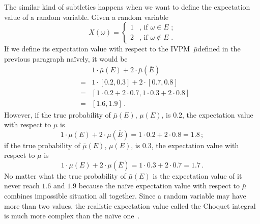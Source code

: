 \documentclass[english,reprint, aps, prl,superscriptaddress, showpacs,
showkeys, longbibliography, amsmath, amssymb]{revtex4-1}
\theoremstyle{plain}
\theoremstyle{definition}
\begin{document}
The similar kind of subtleties happens when we want to define the
expectation value of a random variable. Given a random variable
\begin{equation}
X\left(\omega\right)=\begin{cases}
1 & \textrm{, if }\omega\in E\textrm{ ;}\\
2 & \textrm{, if }\omega\notin E\textrm{ .}
\end{cases}
\end{equation}
If we define its expectation value with respect to the IVPM~$\bar{\mu}$defined
in the previous paragraph naïvely, it would be\begin{subequations}
\begin{eqnarray}
 &  & 1\cdot\bar{\mu}(E)+2\cdot\bar{\mu}(\overline{E})\\
 & = & 1\cdot[0.2,0.3]+2\cdot[0.7,0.8]\\
 & = & [1\cdot0.2+2\cdot0.7,1\cdot0.3+2\cdot0.8]\\
 & = & [1.6,1.9]\,.
\end{eqnarray}
\end{subequations}However, if the true probability of {$\bar{\mu}(E)$},
$\mu(E)$, is $0.2$, the expectation value with respect to $\mu$
is 
\begin{equation}
1\cdot\mu(E)+2\cdot\mu(\overline{E})=1\cdot0.2+2\cdot0.8=1.8\,;
\end{equation}
if the true probability of {$\bar{\mu}(E)$}, $\mu(E)$, is $0.3$,
the expectation value with respect to $\mu$ is
\begin{equation}
1\cdot\mu(E)+2\cdot\mu(\overline{E})=1\cdot0.3+2\cdot0.7=1.7\,.
\end{equation}
No matter what the true probability of {$\bar{\mu}(E)$ is the expectation
value of it never reach $1.6$ and $1.9$ because the }naïve expectation
value with respect to $\bar{\mu}$ combines impossible situation all
together. Since a random variable may have more than two values, the
realistic expectation value called the Choquet integral is much more
complex than the naïve one~\citep{Vitali1925,Choquet1954,GilboaSchmeidler1994,Grabisch2016}.
\end{document}
